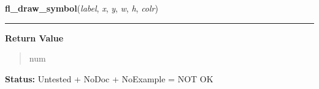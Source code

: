     \vspace{0.5ex}

\hspace{.8\funcindent}\begin{boxedminipage}{\funcwidth}

    \raggedright \textbf{fl\_draw\_symbol}(\textit{label}, \textit{x}, \textit{y}, \textit{w}, \textit{h}, \textit{colr})

    \vspace{-1.5ex}

    \rule{\textwidth}{0.5\fboxrule}
\setlength{\parskip}{2ex}
\setlength{\parskip}{1ex}
      \textbf{Return Value}
    \vspace{-1ex}

      \begin{quote}
      num

      \end{quote}

\textbf{Status:} Untested + NoDoc + NoExample = NOT OK



    \end{boxedminipage}

    \label{xformslib:library:fl_mapcolor}

    \vspace{0.5ex}

